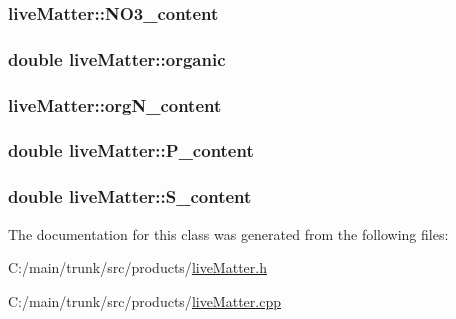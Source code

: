 \label{classlive_matter_a8e7a9da472ef95f8426cab359acae69f}
\hypertarget{classlive_matter_a43a0f729f017276359cbf8995a8fda66}{
\subsubsection[{NO3\_\-content}]{ {\bf liveMatter::NO3\_\-content}}}
\label{classlive_matter_a43a0f729f017276359cbf8995a8fda66}
\hypertarget{classlive_matter_ac8b878ebaf904e10140d75715064f757}{
\subsubsection[{organic}]{\setlength{\rightskip}{0pt plus 5cm}double {\bf liveMatter::organic}}}
\label{classlive_matter_ac8b878ebaf904e10140d75715064f757}
\hypertarget{classlive_matter_a7fd6353da8a485db5b95b1ccd78a5776}{
\subsubsection[{orgN\_\-content}]{ {\bf liveMatter::orgN\_\-content}}}
\label{classlive_matter_a7fd6353da8a485db5b95b1ccd78a5776}
\hypertarget{classlive_matter_a66a67e2b61774ef9e9ec3054c8687559}{
\subsubsection[{P\_\-content}]{\setlength{\rightskip}{0pt plus 5cm}double {\bf liveMatter::P\_\-content}}}
\label{classlive_matter_a66a67e2b61774ef9e9ec3054c8687559}
\hypertarget{classlive_matter_ac4d5d679085aa89d920b2e06f2621b1f}{
\subsubsection[{S\_\-content}]{\setlength{\rightskip}{0pt plus 5cm}double {\bf liveMatter::S\_\-content}}}
\label{classlive_matter_ac4d5d679085aa89d920b2e06f2621b1f}


The documentation for this class was generated from the following files:\begin{DoxyCompactItemize}
\item 
C:/main/trunk/src/products/\hyperlink{live_matter_8h}{liveMatter.h}\item 
C:/main/trunk/src/products/\hyperlink{live_matter_8cpp}{liveMatter.cpp}\end{DoxyCompactItemize}

